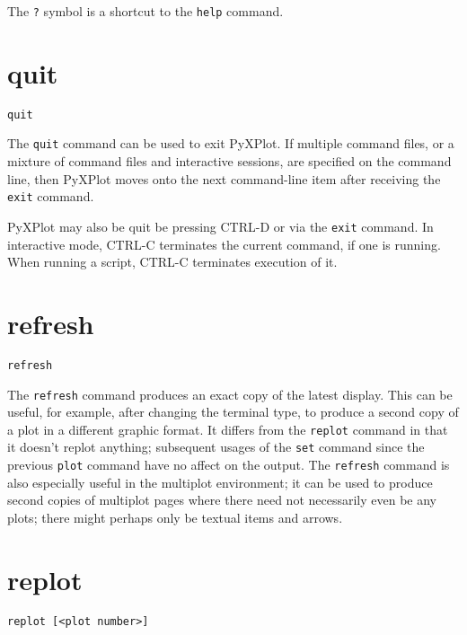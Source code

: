 \documentclass[a4paper,onecolumn,11pt]{book}
\begin{document}
The {\tt ?} symbol is a shortcut to the {\tt help} command.


\section{quit}

\begin{verbatim}
quit
\end{verbatim}

The {\tt quit} command can be used to exit PyXPlot. If multiple command files,
or a mixture of command files and interactive sessions, are specified on the
command line, then PyXPlot moves onto the next command-line item after receiving
the {\tt exit} command.

PyXPlot may also be quit be pressing CTRL-D or via the {\tt exit} command. In
interactive mode, CTRL-C terminates the current command, if one is running.
When running a script, CTRL-C terminates execution of it.


\section{refresh}

\begin{verbatim}
refresh
\end{verbatim}

The {\tt refresh} command produces an exact copy of the latest display. This can
be useful, for example, after changing the terminal type, to produce a second
copy of a plot in a different graphic format. It differs from the {\tt replot}
command in that it doesn't replot anything; subsequent usages of the {\tt set}
command since the previous {\tt plot} command have no affect on the output. The
{\tt refresh} command is also especially useful in the multiplot environment; it
can be used to produce second copies of multiplot pages where there need not
necessarily even be any plots; there might perhaps only be textual items and
arrows.


\section{replot}

\begin{verbatim}
replot [<plot number>]
\end{verbatim}
\end{document}
